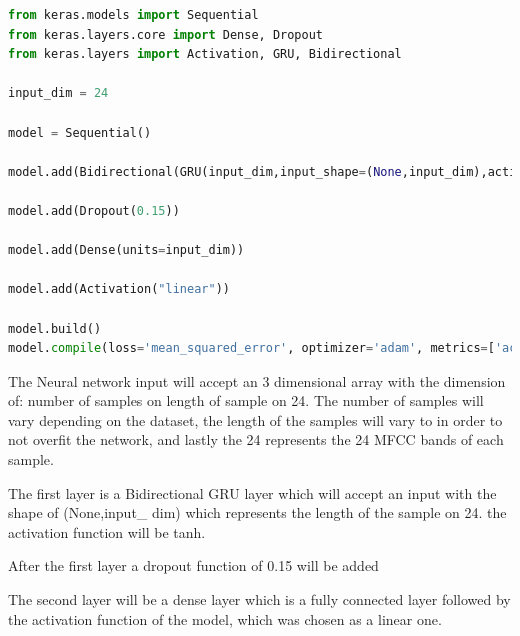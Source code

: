 \begin{lstlisting}[language=Python, caption=Code for the model, label=lst:nnmodel]
from keras.models import Sequential
from keras.layers.core import Dense, Dropout
from keras.layers import Activation, GRU, Bidirectional

input_dim = 24

model = Sequential()

model.add(Bidirectional(GRU(input_dim,input_shape=(None,input_dim),activation='tanh',return_sequences=True)))

model.add(Dropout(0.15))

model.add(Dense(units=input_dim))

model.add(Activation("linear"))

model.build()
model.compile(loss='mean_squared_error', optimizer='adam', metrics=['accuracy'])
\end{lstlisting}

The Neural network input will accept an 3 dimensional array with the dimension of: number of samples on length of sample on 24.
The number of samples will vary depending on the dataset, the length of the samples will vary to in order to not overfit the network, and lastly the 24 represents the 24 MFCC bands of each sample.


The first layer is a Bidirectional GRU layer which will accept an input with the shape of (None,input\_ dim) which represents the length of the sample on 24.
the activation function will be tanh.

After the first layer a dropout function of 0.15 will be added

The second layer will be a dense layer which is a fully connected layer followed by the activation function of the model, which was chosen as a linear one.

